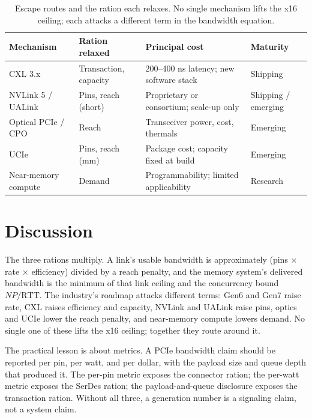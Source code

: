 \documentclass[10pt,letterpaper]{article}
\begin{document}
\begin{table}[t]
\centering
\caption{Escape routes and the ration each relaxes. No single mechanism lifts the x16 ceiling; each attacks a different term in the bandwidth equation.}
\label{tab:escape}
\footnotesize
\setlength{\tabcolsep}{4pt}
\renewcommand{\arraystretch}{1.08}
\begin{tabularx}{\linewidth}{@{}>{\raggedright\arraybackslash}p{1.12in}>{\raggedright\arraybackslash}p{1.32in}X>{\raggedright\arraybackslash}p{0.82in}@{}}
\toprule
Mechanism & Ration relaxed & Principal cost & Maturity\\
\midrule
CXL 3.x & Transaction, capacity & 200--400 ns latency; new software stack & Shipping\\
NVLink 5 / UALink & Pins, reach (short) & Proprietary or consortium; scale-up only & Shipping / emerging\\
Optical PCIe / CPO & Reach & Transceiver power, cost, thermals & Emerging\\
UCIe & Pins, reach (mm) & Package cost; capacity fixed at build & Emerging\\
Near-memory compute & Demand & Programmability; limited applicability & Research\\
\bottomrule
\end{tabularx}
\end{table}

\section{Discussion}

The three rations multiply. A link's usable bandwidth is approximately (pins $\times$ rate $\times$ efficiency) divided by a reach penalty, and the memory system's delivered bandwidth is the minimum of that link ceiling and the concurrency bound $NP/\mathrm{RTT}$. The industry's roadmap attacks different terms: Gen6 and Gen7 raise rate, CXL raises efficiency and capacity, NVLink and UALink raise pins, optics and UCIe lower the reach penalty, and near-memory compute lowers demand. No single one of these lifts the x16 ceiling; together they route around it.

The practical lesson is about metrics. A PCIe bandwidth claim should be reported per pin, per watt, and per dollar, with the payload size and queue depth that produced it. The per-pin metric exposes the connector ration; the per-watt metric exposes the SerDes ration; the payload-and-queue disclosure exposes the transaction ration. Without all three, a generation number is a signaling claim, not a system claim.
\end{document}
